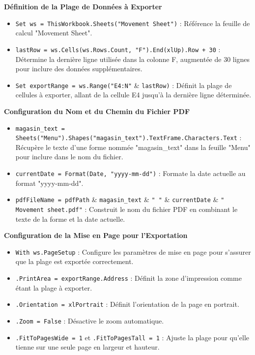 \documentclass[a4paper, oneside, 12pt, final]{extreport}
\begin{document}
\textbf{Définition de la Plage de Données à Exporter}

\begin{itemize}
    \item \texttt{Set ws = ThisWorkbook.Sheets("Movement Sheet")} : Référence la feuille de calcul "Movement Sheet".
    \item \texttt{lastRow = ws.Cells(ws.Rows.Count, "F").End(xlUp).Row + 30} : Détermine la dernière ligne utilisée dans la colonne F, augmentée de 30 lignes pour inclure des données supplémentaires.
    \item \texttt{Set exportRange = ws.Range("E4:N"} \& \texttt{lastRow)} : Définit la plage de cellules à exporter, allant de la cellule E4 jusqu'à la dernière ligne déterminée.
\end{itemize}

\textbf{Configuration du Nom et du Chemin du Fichier PDF}

\begin{itemize}
    \item \texttt{magasin\_text = Sheets("Menu").Shapes("magasin\_text").TextFrame.Characters.Text} : Récupère le texte d'une forme nommée "magasin\_text" dans la feuille "Menu" pour inclure dans le nom du fichier.
    \item \texttt{currentDate = Format(Date, "yyyy-mm-dd")} : Formate la date actuelle au format "yyyy-mm-dd".
    \item \texttt{pdfFileName = pdfPath} \& \texttt{magasin\_text} \& \texttt{" "} \& \texttt{currentDate} \& \texttt{" Movement sheet.pdf"} : Construit le nom du fichier PDF en combinant le texte de la forme et la date actuelle.
\end{itemize}

\textbf{Configuration de la Mise en Page pour l'Exportation}

\begin{itemize}
    \item \texttt{With ws.PageSetup} : Configure les paramètres de mise en page pour s'assurer que la plage est exportée correctement.
    \item \texttt{.PrintArea = exportRange.Address} : Définit la zone d'impression comme étant la plage à exporter.
    \item \texttt{.Orientation = xlPortrait} : Définit l'orientation de la page en portrait.
    \item \texttt{.Zoom = False} : Désactive le zoom automatique.
    \item \texttt{.FitToPagesWide = 1} et \texttt{.FitToPagesTall = 1} : Ajuste la plage pour qu'elle tienne sur une seule page en largeur et hauteur.
\end{itemize}
\end{document}

